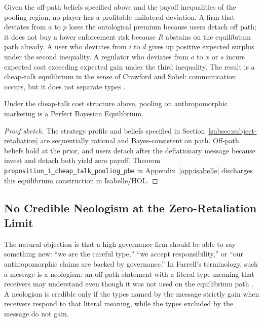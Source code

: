 Given the off-path beliefs specified above and the payoff inequalities of the
pooling region, no player has a profitable unilateral deviation. A firm that deviates from $a$
to $p$ loses the ontological premium because users detach off path; it does not
buy a lower enforcement risk because $R$ abstains on the equilibrium path
already. A user who deviates from $i$ to $d$ gives up positive expected surplus
under the second inequality. A regulator who deviates from $o$ to $x$ or $s$
incurs expected cost exceeding expected gain under the third inequality. The
result is a cheap-talk equilibrium in the sense of Crawford and Sobel:
communication occurs, but it does not separate types \citep{crawford_sobel1982}.

\begin{proposition}
\label{prop:pooling-pbe}
Under the cheap-talk cost structure above, pooling on anthropomorphic marketing
is a Perfect Bayesian Equilibrium.
\end{proposition}

\begin{proof}[Proof sketch]
The strategy profile and beliefs specified in Section~\ref{subsec:subject-retaliation} are
sequentially rational and Bayes-consistent on path. Off-path beliefs hold at
the prior, and users detach after the deflationary message because invest and
detach both yield zero payoff. Theorem \texttt{proposition\_\allowbreak{}1\_\allowbreak{}cheap\_\allowbreak{}talk\_\allowbreak{}pooling\_\allowbreak{}pbe} in Appendix~\ref{app:isabelle} discharges this equilibrium construction in Isabelle/HOL.
\end{proof}

\subsection{No Credible Neologism at the Zero-Retaliation Limit}
\label{subsec:neologism-proof}

The natural objection is that a high-governance firm should be able to say
something new: ``we are the careful type,'' ``we accept responsibility,'' or
``our anthropomorphic claims are backed by governance.'' In Farrell's terminology,
such a message is a neologism: an off-path statement with a literal type meaning
that receivers may understand even though it was not used on the equilibrium
path \citep{farrell1993}. A neologism is credible only if the types named by the
message strictly gain when receivers respond to that literal meaning, while the
types excluded by the message do not gain.

